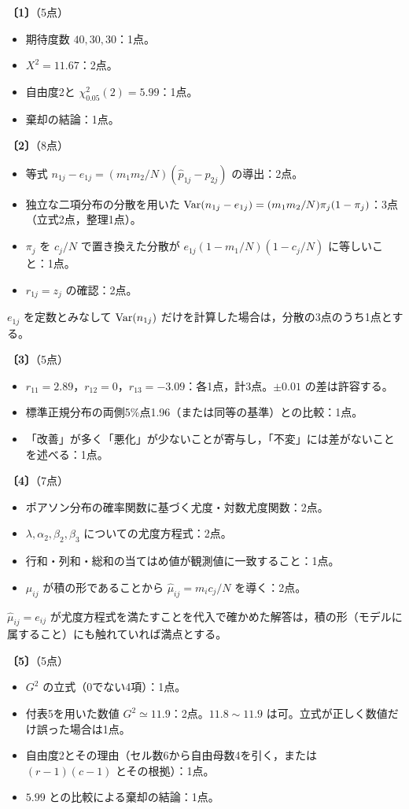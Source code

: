 \documentclass[a4paper,11pt]{ltjsarticle}
\renewcommand{\ans}[1]{\par\medskip\noindent\textbf{〔#1〕}\quad}
\renewcommand{\points}[1]{\hfill\textnormal{（#1点）}\par\nobreak}
\begin{document}
\ans{1}\points{5}
\begin{itemize}
\item 期待度数 $40,30,30$：1点。
\item $X^2=11.67$：2点。
\item 自由度2と $\chi^2_{0.05}(2)=5.99$：1点。
\item 棄却の結論：1点。
\end{itemize}

\ans{2}\points{8}
\begin{itemize}
\item 等式 $n_{1j}-e_{1j}=(m_1m_2/N)(\hat p_{1j}-\hat p_{2j})$ の導出：2点。
\item 独立な二項分布の分散を用いた $\operatorname{Var}(n_{1j}-e_{1j})=(m_1m_2/N)\pi_j(1-\pi_j)$：3点（立式2点，整理1点）。
\item $\pi_j$ を $c_j/N$ で置き換えた分散が $e_{1j}(1-m_1/N)(1-c_j/N)$ に等しいこと：1点。
\item $r_{1j}=z_j$ の確認：2点。
\end{itemize}
$e_{1j}$ を定数とみなして $\operatorname{Var}(n_{1j})$ だけを計算した場合は，分散の3点のうち1点とする。

\ans{3}\points{5}
\begin{itemize}
\item $r_{11}=2.89$，$r_{12}=0$，$r_{13}=-3.09$：各1点，計3点。$\pm0.01$ の差は許容する。
\item 標準正規分布の両側5\%点1.96（または同等の基準）との比較：1点。
\item 「改善」が多く「悪化」が少ないことが寄与し，「不変」には差がないことを述べる：1点。
\end{itemize}

\ans{4}\points{7}
\begin{itemize}
\item ポアソン分布の確率関数に基づく尤度・対数尤度関数：2点。
\item $\lambda,\alpha_2,\beta_2,\beta_3$ についての尤度方程式：2点。
\item 行和・列和・総和の当てはめ値が観測値に一致すること：1点。
\item $\mu_{ij}$ が積の形であることから $\hat\mu_{ij}=m_ic_j/N$ を導く：2点。
\end{itemize}
$\hat\mu_{ij}=e_{ij}$ が尤度方程式を満たすことを代入で確かめた解答は，積の形（モデルに属すること）にも触れていれば満点とする。

\ans{5}\points{5}
\begin{itemize}
\item $G^2$ の立式（0でない4項）：1点。
\item 付表5を用いた数値 $G^2\simeq11.9$：2点。$11.8\sim11.9$ は可。立式が正しく数値だけ誤った場合は1点。
\item 自由度2とその理由（セル数6から自由母数4を引く，または $(r-1)(c-1)$ とその根拠）：1点。
\item $5.99$ との比較による棄却の結論：1点。
\end{itemize}
\newpage
\end{document}
